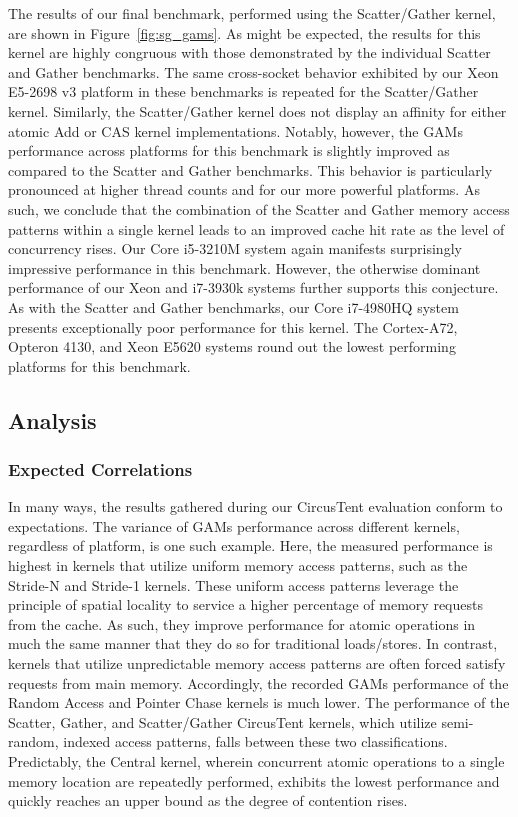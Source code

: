 The results of our final benchmark, performed using the Scatter/Gather kernel, are shown in Figure~\ref{fig:sg_gams}.
As might be expected, the results for this kernel are highly congruous with those demonstrated by the individual Scatter and Gather benchmarks.
The same cross-socket behavior exhibited by our Xeon E5-2698 v3 platform in these benchmarks is repeated for the Scatter/Gather kernel.
Similarly, the Scatter/Gather kernel does not display an affinity for either atomic Add or CAS kernel implementations.
Notably, however, the GAMs performance across platforms for this benchmark is slightly improved as compared to the Scatter and Gather benchmarks.
This behavior is particularly pronounced at higher thread counts and for our more powerful platforms.
As such, we conclude that the combination of the Scatter and Gather memory access patterns within a single kernel leads to an improved cache hit rate as the level of concurrency rises.
Our Core i5-3210M system again manifests surprisingly impressive performance in this benchmark.
However, the otherwise dominant performance of our Xeon and i7-3930k systems further supports this conjecture.
As with the Scatter and Gather benchmarks, our Core i7-4980HQ system presents exceptionally poor performance for this kernel.
The Cortex-A72, Opteron 4130, and Xeon E5620 systems round out the lowest performing platforms for this benchmark.

\subsection{Analysis}
\label{subsec:analysis}

\subsubsection{Expected Correlations}
\label{subsubsec:expected_correlations}

In many ways, the results gathered during our CircusTent evaluation conform to expectations.
The variance of GAMs performance across different kernels, regardless of platform, is one such example.
Here, the measured performance is highest in kernels that utilize uniform memory access patterns, such as the Stride-N and Stride-1 kernels.
These uniform access patterns leverage the principle of spatial locality to service a higher percentage of memory requests from the cache.
As such, they improve performance for atomic operations in much the same manner that they do so for traditional loads/stores.
In contrast, kernels that utilize unpredictable memory access patterns are often forced satisfy requests from main memory.
Accordingly, the recorded GAMs performance of the Random Access and Pointer Chase kernels is much lower.
The performance of the Scatter, Gather, and Scatter/Gather CircusTent kernels, which utilize semi-random, indexed access patterns, falls between these two classifications.
Predictably, the Central kernel, wherein concurrent atomic operations to a single memory location are repeatedly performed, exhibits the lowest performance and quickly reaches an upper bound as the degree of contention rises.

